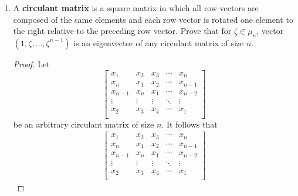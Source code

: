 \documentclass[../psets.tex]{subfiles}
\begin{document}
\begin{enumerate}
\begin{enumerate}
\begin{proof}
\begin{equation*}
\begin{bmatrix}
                \end{bmatrix}
            \end{equation*}
            Thus, we have found four distinct eigenvectors for a $4\times 4$ matrix. Therefore, we have found all of the eigenvalues. Their product equals the determinant, and is also a factorization of the determinant. In particular, the factorized group determinant for $K_4$ is
            \begin{equation*}
                \boxed{(a+b+c+d)(a+b-c-d)(a-b+c-d)(a-b-c+d)}
            \end{equation*}
        \end{proof}
        \item A \textbf{circulant matrix} is a square matrix in which all row vectors are composed of the same elements and each row vector is rotated one element to the right relative to the preceding row vector. Prove that for $\zeta\in\mu_n$, vector $(1,\zeta,\dots,\zeta^{n-1})$ is an eigenvector of any circulant matrix of size $n$.
        \begin{proof}
            Let
            \begin{equation*}
                \begin{bmatrix}
                    x_1     & x_2    & x_3    & \cdots & x_n    \\
                    x_n     & x_1    & x_2    & \cdots & x_{n-1}\\
                    x_{n-1} & x_n    & x_1    & \cdots & x_{n-2}\\
                    \vdots  & \vdots & \vdots & \ddots & \vdots \\
                    x_2     & x_3    & x_4    & \cdots & x_1    \\
                \end{bmatrix}
            \end{equation*}
            be an arbitrary circulant matrix of size $n$. It follows that
            \begin{align*}
                \begin{bmatrix}
                    x_1     & x_2    & x_3    & \cdots & x_n    \\
                    x_n     & x_1    & x_2    & \cdots & x_{n-1}\\
                    x_{n-1} & x_n    & x_1    & \cdots & x_{n-2}\\
                    \vdots  & \vdots & \vdots & \ddots & \vdots \\
                    x_2     & x_3    & x_4    & \cdots & x_1    \\

\end{bmatrix}
\end{align*}
\end{proof}
\end{enumerate}
\end{enumerate}
\end{document}
